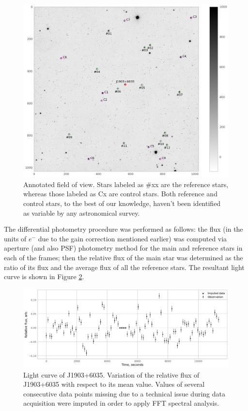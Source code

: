 \documentclass{aastex631}
\begin{document}
\begin{figure}[htbp]
\centering \includegraphics[width=.9\linewidth]{./img/field.png}
\caption{\label{fig:field}Annotated field of view. Stars labeled as
  \#xx are the reference stars, whereas those labeled as Cx are
  control stars. Both reference and control stars, to the best of our
  knowledge, haven't been identified as variable by any astronomical
  survey.}
\end{figure}

The differential photometry procedure was performed as follows: the
flux (in the units of $e^-$ due to the gain correction mentioned
earlier) was computed via aperture (and also PSF) photometry method
for the main and reference stars in each of the frames; then the
relative flux of the main star was determined as the ratio of its flux
and the average flux of all the reference stars. The resultant light
curve is shown in Figure \ref{fig:lc}.

\begin{figure}[htbp]
\centering
\includegraphics[width=.9\linewidth]{./img/lightcurve.png}
\caption{\label{fig:lc}Light curve of J1903+6035. Variation of the
  relative flux of J1903+6035 with respect to its mean value. Values
  of several consecutive data points missing due to a technical issue
  during data acquisition were imputed in order to apply FFT spectral
  analysis.}
\end{figure}
\end{document}
